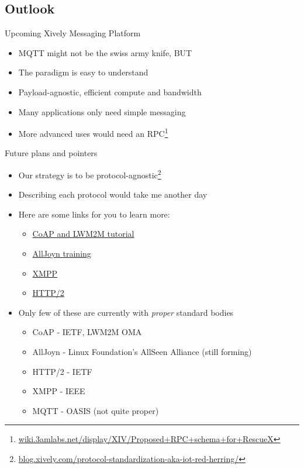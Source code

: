 \documentclass{beamer}
\begin{document}
\subsection{Outlook}

\begin{frame}{Upcoming Xively Messaging Platform}
\begin{itemize}
  \item MQTT might not be the swiss army knife, BUT
  \item The paradigm is easy to understand
  \item Payload-agnostic, efficient compute and bandwidth
  \item Many applications only need simple messaging
  \item More advanced uses would need an RPC\footnote{\href{https://wiki.3amlabs.net/display/XIV/Proposed+RPC+schema+for+RescueX}{wiki.3amlabs.net/display/XIV/Proposed+RPC+schema+for+RescueX}}
\end{itemize}
\end{frame}

\begin{frame}{Future plans and pointers}
\begin{itemize}
  \item Our strategy is to be protocol-agnostic\footnote{\href{http://blog.xively.com/protocol-standardization-aka-iot-red-herring/}{blog.xively.com/protocol-standardization-aka-iot-red-herring/}}
  \item Describing each protocol would take me another day
  \item Here are some links for you to learn more:
  \begin{itemize}
    \item \href{http://youtu.be/4bSr5x5gKvA}{CoAP and LWM2M tutorial}
    \item \href{https://wiki.allseenalliance.org/training}{AllJoyn training}
    \item \href{http://wiki.xmpp.org/web/InternetOfThings}{XMPP}
    \item \href{http://daniel.haxx.se/http2/}{HTTP/2}
  \end{itemize}
  \item Only few of these are currently with \emph{proper} standard bodies
  \begin{itemize}
    \item CoAP - IETF, LWM2M OMA
    \item AllJoyn - Linux Foundation's AllSeen Alliance (still forming)
    \item HTTP/2 - IETF
    \item XMPP - IEEE
    \item MQTT - OASIS (not quite proper)
  \end{itemize}
\end{itemize}
\end{frame}
\end{document}
